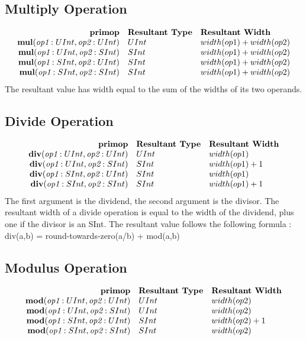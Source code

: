 \documentclass[10pt]{article}
\begin{document}
\subsection{Multiply Operation}
\[
\begin{array}{rll}
\text{\bf primop} & \text{\bf Resultant Type} & \text{\bf Resultant Width} \\
\text{\bf mul}(\text{\em op1}:UInt, \text{\em op2}:UInt) &   UInt & width(op1) + width(op2)  \\
\text{\bf mul}(\text{\em op1}:UInt, \text{\em op2}:SInt) &   SInt & width(op1) + width(op2)  \\
\text{\bf mul}(\text{\em op1}:SInt, \text{\em op2}:UInt) &   SInt & width(op1) + width(op2)  \\
\text{\bf mul}(\text{\em op1}:SInt, \text{\em op2}:SInt) &   SInt & width(op1) + width(op2)  \\
\end{array}
\]
The resultant value has width equal to the sum of the widths of its two operands.

\subsection{Divide Operation}
\[
\begin{array}{rll}
\text{\bf primop} & \text{\bf Resultant Type} & \text{\bf Resultant Width} \\
\text{\bf div}(\text{\em op1}:UInt, \text{\em op2}:UInt) &   UInt & width(op1)     \\
\text{\bf div}(\text{\em op1}:UInt, \text{\em op2}:SInt) &   SInt & width(op1) + 1  \\
\text{\bf div}(\text{\em op1}:SInt, \text{\em op2}:UInt) &   SInt & width(op1)     \\
\text{\bf div}(\text{\em op1}:SInt, \text{\em op2}:SInt) &   SInt & width(op1) + 1  \\
\end{array}
\]
The first argument is the dividend, the second argument is the divisor.
The resultant width of a divide operation is equal to the width of the dividend, plus one if the divisor is an SInt.
The resultant value follows the following formula : div(a,b) = round-towards-zero(a/b) + mod(a,b)

\subsection{Modulus Operation}
\[
\begin{array}{rll}
\text{\bf primop} & \text{\bf Resultant Type} & \text{\bf Resultant Width} \\
\text{\bf mod}(\text{\em op1}:UInt, \text{\em op2}:UInt) &   UInt & width(op2)     \\
\text{\bf mod}(\text{\em op1}:UInt, \text{\em op2}:SInt) &   UInt & width(op2)     \\
\text{\bf mod}(\text{\em op1}:SInt, \text{\em op2}:UInt) &   SInt & width(op2) + 1 \\
\text{\bf mod}(\text{\em op1}:SInt, \text{\em op2}:SInt) &   SInt & width(op2)     \\
\end{array}
\]
\end{document}
